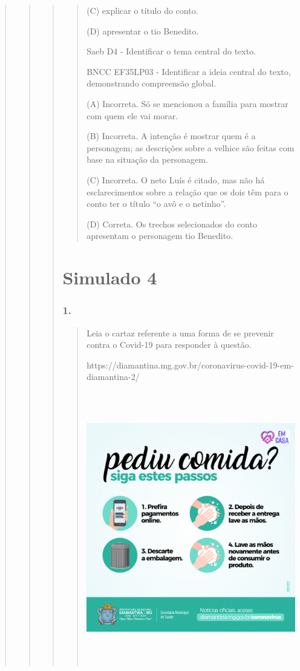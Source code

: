 \begin{quote}
\begin{quote}
\begin{quote}
\begin{quote}
(C) explicar o título do conto.

(D) apresentar o tio Benedito.

Saeb D4 - Identificar o tema central do texto.

BNCC EF35LP03 - Identificar a ideia central do texto, demonstrando
compreensão global.

(A) Incorreta. Só se mencionou a família para mostrar com quem ele vai
morar.

(B) Incorreta. A intenção é mostrar quem é a personagem; as descrições
sobre a velhice são feitas com base na situação da personagem.

(C) Incorreta. O neto Luís é citado, mas não há esclarecimentos sobre a
relação que os dois têm para o conto ter o título ``o avô e o netinho''.

(D) Correta. Os trechos selecionados do conto apresentam o personagem
tio Benedito.
\end{quote}

\section{Simulado 4}\label{simulado-4}

\subsubsection{1. }\label{section-91}

\begin{quote}
Leia o cartaz referente a uma forma de se prevenir contra o Covid-19
para responder à questão.

https://diamantina.mg.gov.br/coronavirus-covid-19-em-diamantina-2/

\includegraphics[width=4.68750in,height=4.68750in]{media/image36.png}


\end{quote}
\end{quote}
\end{quote}
\end{quote}
